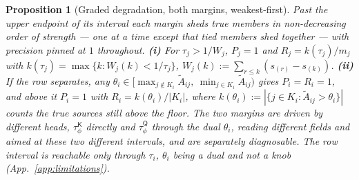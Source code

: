\documentclass{article}
\newtheorem{proposition}{Proposition}
\newcommand{\tauK}{\tau^{\mathsf{K}}_\phi}
\newcommand{\tauQ}{\tau^{\mathsf{Q}}_\phi}
\begin{document}
\begin{proposition}[Graded degradation, both margins, weakest-first]
\label{prop:graded}
Past the upper endpoint of its interval each margin sheds true members in \emph{non-decreasing}
order of strength --- one at a time except that tied members shed together --- with precision
pinned at $1$ throughout. \textbf{(i)} For
$\tau_j>1/W_j$, $P_j=1$ and $R_j=k(\tau_j)/m_j$ with $k(\tau_j)=\max\{k : W_j(k)<1/\tau_j\}$,
$W_j(k):=\sum_{r\le k}(s_{(r)}-s_{(k)})$. \textbf{(ii)} If the row separates, any
$\theta_i\in[\max_{j\notin K_i}\tilde A_{ij},\ \min_{j\in K_i}\tilde A_{ij})$ gives $P_i=R_i=1$,
and above it $P_i=1$ with $R_i=k(\theta_i)/|K_i|$, where
$k(\theta_i):=|\{j\in K_i : \tilde A_{ij}>\theta_i\}|$ counts the true sources still above the
floor. The two margins are driven by different
heads, $\tauK$ directly and $\tauQ$ through the dual $\theta_i$, reading different fields and
aimed at these two different intervals, and are separately diagnosable. The row interval is
reachable only through $\tau_i$, $\theta_i$ being a dual and not a knob (App.~\ref{app:limitations}).
\end{proposition}
\end{document}
